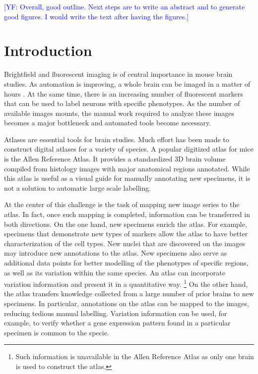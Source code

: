 \documentclass{llncs}
\newcommand{\authcmt}[2]{\textcolor{#1}{#2}}
\newcommand{\yoav}[1]{\authcmt{blue}{[YF: #1]}}
\begin{document}
\yoav{Overall, good outline. Next steps are to write an abstract and
  to generate good figures. I would write the text after having the
  figures.}

\section{Introduction}


Brightfield and fluorescent imaging is of central importance in mouse brain
studies. As automation is improving, a whole brain can be imaged in a matter of hours	. At the same time, there is an increasing number of
fluorescent markers that can be used to label neurons with specific
phenotypes. As the number of available images mounts, the manual work
required to analyze these images becomes a major bottleneck and 
automated tools become necessary.

Atlases are essential tools for brain studies. Much effort has been made to construct digital atlases for a variety of species. A popular digitized atlas for mice is the Allen Reference Atlas. It provides a standardized 3D brain volume compiled from histology images with major anatomical regions annotated. While this atlas is useful as a visual guide for manually annotating new specimens, it is not a solution to automatic large scale labelling. 

At the center of this challenge is the task of mapping new image series to the atlas. In fact, once such mapping is completed, information can be transferred in both directions. On the one hand, new specimens enrich the atlas. For example, specimens that demonstrate new types of markers allow the atlas to have better characterization of the cell types. New nuclei that are discovered on the images may introduce new annotations to the atlas. New specimens also serve as additional data points for better modelling of the phenotypes of specific regions, as well as its variation within the same species. An atlas can incorporate variation information and present it in a quantitative way.  \footnote{Such information is unavailable in the Allen Reference Atlas as only one brain is used to construct the atlas.} On the other hand, the atlas transfers knowledge collected from a large number of prior brains to new specimens. In particular, annotations on the atlas can be mapped to the images, reducing tedious manual labelling. Variation information can be used, for example, to verify whether a gene expression pattern found in a particular specimen is common to the specie.
\end{document}
